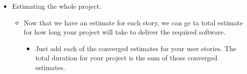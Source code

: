 \documentclass[letterpaper]{article}
\begin{document}
\begin{itemize}
    \item Estimating the whole project. 
    \begin{itemize}
        \item Now that we have an estimate for each story, we can ge ta total estimate for how long your project will take to deliver the required software. 
        \begin{itemize}
            \item Just add each of the converged estimates for your user stories. The total duration for your project is the sum of those converged estimates. 
        \end{itemize}
    \end{itemize}
\end{itemize}
\end{document}
